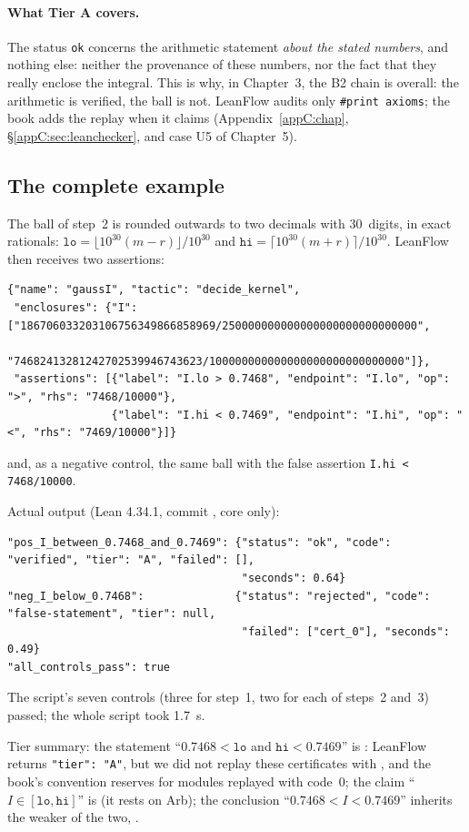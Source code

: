 \paragraph{What Tier A covers.} The status \texttt{ok} concerns the arithmetic statement \emph{about the stated
numbers}, and nothing else: neither the provenance of these numbers, nor the fact that they really enclose the
integral. This is why, in Chapter~3, the B2 chain is \tierC{} overall: the arithmetic is verified, the ball is not.
LeanFlow audits only \texttt{\#print axioms}; the book adds the  replay when it claims \tierA{}
(Appendix~\ref{appC:chap}, §\ref{appC:sec:leanchecker}, and case U5 of Chapter~5).

\subsection{The complete example}
The ball of step~2 is rounded outwards to two decimals with 30~digits, in exact rationals:
$\mathtt{lo}=\lfloor10^{30}(m-r)\rfloor/10^{30}$ and $\mathtt{hi}=\lceil10^{30}(m+r)\rceil/10^{30}$. LeanFlow then
receives two assertions:
\begin{lstlisting}[style=appC,language={}]
{"name": "gaussI", "tactic": "decide_kernel",
 "enclosures": {"I": ["186706033203106756349866858969/250000000000000000000000000000",
                      "74682413281242702539946743623/100000000000000000000000000000"]},
 "assertions": [{"label": "I.lo > 0.7468", "endpoint": "I.lo", "op": ">", "rhs": "7468/10000"},
                {"label": "I.hi < 0.7469", "endpoint": "I.hi", "op": "<", "rhs": "7469/10000"}]}
\end{lstlisting}
and, as a negative control, the same ball with the false assertion \texttt{I.hi < 7468/10000}.
\begin{numbox}
Actual output (Lean 4.34.1, commit , core only):
\begin{lstlisting}[style=appC,language={}]
"pos_I_between_0.7468_and_0.7469": {"status": "ok", "code": "verified", "tier": "A", "failed": [],
                                    "seconds": 0.64}
"neg_I_below_0.7468":              {"status": "rejected", "code": "false-statement", "tier": null,
                                    "failed": ["cert_0"], "seconds": 0.49}
"all_controls_pass": true
\end{lstlisting}
The script's seven controls (three for step~1, two for each of steps~2 and~3) passed; the whole script took 1.7~s.
\end{numbox}
\noindent Tier summary: the statement ``$0.7468<\mathtt{lo}$ and $\mathtt{hi}<0.7469$'' is \tierAs{}: LeanFlow
returns \texttt{"tier": "A"}, but we did not replay these certificates with , and the book's
convention reserves \tierA{} for modules replayed with code~$0$; the claim ``$I\in[\mathtt{lo},\mathtt{hi}]$'' is
\tierC{} (it rests on Arb); the conclusion ``$0.7468<I<0.7469$'' inherits the weaker of the two, \tierC.

